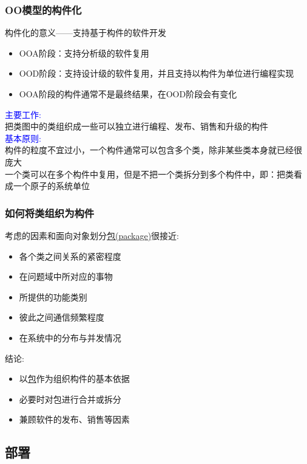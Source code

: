 \documentclass[compress]{beamer}
\begin{document}
\begin{frame}
  \frametitle{OO模型的构件化}
   {
  构件化的意义——支持基于构件的软件开发
  \begin{itemize}
    \item OOA阶段：支持分析级的软件复用
    \item OOD阶段：支持设计级的软件复用，并且支持以构件为单位进行编程实现
    \item OOA阶段的构件通常不是最终结果，在OOD阶段会有变化
  \end{itemize}
  }

   {
    \textcolor{blue}{主要工作:} \\
    把类图中的类组织成一些可以独立进行编程、发布、销售和升级的构件 \\[2ex]

    \textcolor{blue}{基本原则:} \\
  构件的粒度不宜过小，一个构件通常可以包含多个类，除非某些类本身就已经很
  庞大 \\

  一个类可以在多个构件中复用，但是不把一个类拆分到多个构件中，即：把类看
  成一个原子的系统单位
  }

\end{frame}

\begin{frame}
  \frametitle{如何将类组织为构件}

   {
  {考虑的因素和面向对象划分\uline{包(package)}很接近:} 

  \begin{itemize}
    \item 各个类之间关系的紧密程度
    \item 在问题域中所对应的事物
    \item 所提供的功能类别
    \item 彼此之间通信频繁程度
    \item 在系统中的分布与并发情况
  \end{itemize}
  }

   {
  结论:

  \begin{itemize}
    \item 以\uline{包}作为组织构件的基本依据
    \item 必要时对包进行合并或拆分
    \item 兼顾软件的发布、销售等因素
  \end{itemize}
  }
\end{frame}

\subsection{部署}
\end{document}

